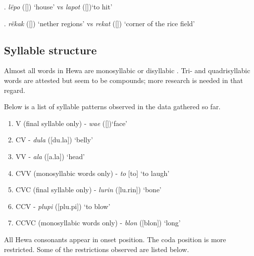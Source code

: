 \documentclass{article}
\begin{document}
\ex. \label{ex:lap} \textit{lëpo} ([]) `house' vs \textit{lapot}  ([])`to hit'

\ex. \label{ex:rek} \textit{rëkak} ([]) `nether regions' vs \textit{rekat} ([]) `corner of the rice field'

\subsection{Syllable structure}\label{sec:syl}


Almost all words in Hewa are monosyllabic or disyllabic . Tri- and quadrisyllabic words are attested but seem to be compounds; more research is needed in that regard. 

Below is a list of syllable patterns observed in the data gathered so far.

\begin{enumerate}

\item V (final syllable only) - \textit{wae}  ([])`face'
\item CV - \textit{dula} ([du.la]) `belly'
\item VV - \textit{ala} ([a\textlengthmark .la]) `head'
\item CVV (monosyllabic words only) - \textit{to} [to\textlengthmark] `to laugh'
\item CVC (final syllable only) - \textit{lurin} ([lu.rin]) `bone' 
\item CCV - \textit{plupi} ([plu.pi]) `to blow'
\item CCVC (monosyllabic words only) - \textit{blon} ([blon]) `long'


\end{enumerate}

All Hewa consonants appear in onset position. The coda position is more restricted. Some of the restrictions observed are listed below.
\end{document}
